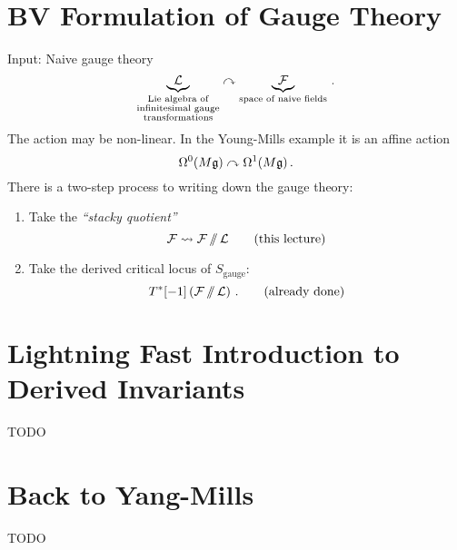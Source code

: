 \section{BV Formulation of Gauge Theory}

Input: Naive gauge theory 
\begin{equation*}
\underbrace{\mathcal{L}}_{
  \substack{\text{Lie algebra of}\\
    \text{infinitesimal gauge}\\
    \text{transformations}} } \curvearrowright
\underbrace{\mathcal{F}}_{\text{space of naive fields}}\,.
\end{equation*}
The action may be non-linear. In the Young-Mills example it is an
affine action
\begin{equation*}
  \Omega^0 (M\mathfrak{g})\curvearrowright\Omega^1 (M\mathfrak{g})\,.
\end{equation*}
There is a two-step process to writing down the gauge theory:
\begin{enumerate}
\item Take the {\em ``stacky quotient''}
  \begin{equation*}
    \mathcal{F} \rightsquigarrow \mathcal{F} \operatorname{/\mkern-6mu/} \mathcal{L} \qquad \text{(this lecture)}
  \end{equation*}
\item Take the derived critical locus of $S_\text{gauge}$:
  \begin{equation*}
    T^*[-1]\left(\mathcal{F}\operatorname{/\mkern-6mu/}\mathcal{L}\right)\,. \qquad \text{(already done)}
  \end{equation*}
\end{enumerate}

\section{Lightning Fast Introduction to Derived Invariants}

TODO

\section{Back to Yang-Mills}

TODO